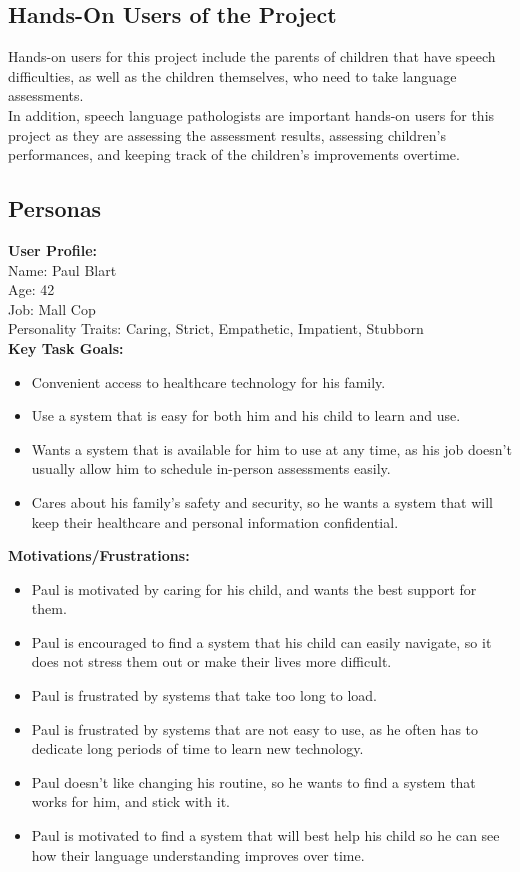 \documentclass[12pt]{article}
\begin{document}
\subsection{Hands-On Users of the Project}
\hspace{2em}Hands-on users for this project include the parents of children that have speech difficulties, as well as the children themselves, who need to take language assessments.\\
\indent In addition, speech language pathologists are important hands-on users for this project as they are assessing the assessment results, assessing children's performances, and keeping track of the children's improvements overtime. 
\subsection{Personas}
\textbf{User Profile:}\\
Name: Paul Blart\\
Age: 42\\
Job: Mall Cop\\
Personality Traits: Caring, Strict, Empathetic, Impatient, Stubborn\\

\textbf{Key Task Goals:}
\begin{itemize}
  \item Convenient access to healthcare technology for his family.
  \item Use a system that is easy for both him and his child to learn and use.
  \item Wants a system that is available for him to use at any time, as his job doesn't usually allow him to schedule in-person assessments easily.
  \item Cares about his family's safety and security, so he wants a system that will keep their healthcare and personal information confidential.  
\end{itemize}

\textbf{Motivations/Frustrations:}
\begin{itemize}
  \item Paul is motivated by caring for his child, and wants the best support for them.
  \item Paul is encouraged to find a system that his child can easily navigate, so it does not stress them out or make their lives more difficult.
  \item Paul is frustrated by systems that take too long to load.
  \item Paul is frustrated by systems that are not easy to use, as he often has to dedicate long periods of time to learn new technology.
  \item Paul doesn't like changing his routine, so he wants to find a system that works for him, and stick with it.
  \item Paul is motivated to find a system that will best help his child so he can see how their language understanding improves over time.
\end{itemize}
\end{document}
